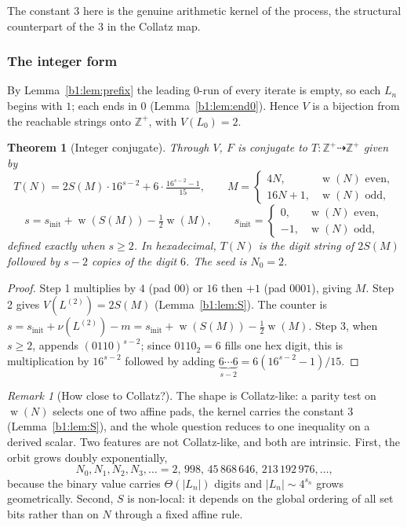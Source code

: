 \documentclass[a4paper]{article}
\theoremstyle{plain}
\newtheorem{thm}[theorem]{Theorem}
\theoremstyle{definition}
\theoremstyle{remark}
\newtheorem{remark}{Remark}[subsection]
\DeclareMathOperator{\popcount}{w}
\begin{document}
The constant $3$ here is the genuine arithmetic kernel of the process, the structural counterpart of the $3$ in the Collatz map.

\subsubsection{The integer form}\label{b1:sec:10.2}
By Lemma~\ref{b1:lem:prefix} the leading $0$-run of every iterate is empty, so each $L_n$ begins with $1$; each ends in $0$ (Lemma~\ref{b1:lem:end0}). Hence $V$ is a bijection from the reachable strings onto $\mathbb Z^+$, with $V(L_0)=2$.

\begin{thm}[Integer conjugate]\label{b1:thm:T}
Through $V$, $F$ is conjugate to $T:\mathbb Z^+\dashrightarrow\mathbb Z^+$ given by
\[ T(N)=2S(M)\cdot 16^{s-2}+6\cdot\tfrac{16^{s-2}-1}{15},\qquad M=\begin{cases}4N,& \popcount(N)\text{ even},\\ 16N+1,& \popcount(N)\text{ odd},\end{cases} \]
\[ s=s_{\mathrm{init}}+\popcount(S(M))-\tfrac12\popcount(M),\qquad s_{\mathrm{init}}=\begin{cases}0,& \popcount(N)\text{ even},\\ -1,& \popcount(N)\text{ odd},\end{cases} \]
defined exactly when $s\ge 2$. In hexadecimal, $T(N)$ is the digit string of $2S(M)$ followed by $s-2$ copies of the digit $6$. The seed is $N_0=2$.
\end{thm}
\begin{proof}
Step 1 multiplies by $4$ (pad $00$) or $16$ then $+1$ (pad $0001$), giving $M$. Step 2 gives $V(L^{(2)})=2S(M)$ (Lemma~\ref{b1:lem:S}). The counter is $s=s_{\mathrm{init}}+\nu(L^{(2)})-m=s_{\mathrm{init}}+\popcount(S(M))-\tfrac12\popcount(M)$. Step 3, when $s\ge 2$, appends $(0110)^{s-2}$; since $0110_2=6$ fills one hex digit, this is multiplication by $16^{s-2}$ followed by adding $\underbrace{6\cdots 6}_{s-2}=6(16^{s-2}-1)/15$.
\end{proof}

\begin{remark}[How close to Collatz?]\label{b1:rem:collatz}
The shape is Collatz-like: a parity test on $\popcount(N)$ selects one of two affine pads, the kernel carries the constant $3$ (Lemma~\ref{b1:lem:S}), and the whole question reduces to one inequality on a derived scalar. Two features are not Collatz-like, and both are intrinsic. First, the orbit grows doubly exponentially,
\[ N_0,N_1,N_2,N_3,\dots=2,\,998,\,45\,868\,646,\,213\,192\,976,\dots, \]
because the binary value carries $\Theta(|L_n|)$ digits and $|L_n|\sim 4^{s_n}$ grows geometrically. Second, $S$ is non-local: it depends on the global ordering of all set bits rather than on $N$ through a fixed affine rule.
\end{remark}
\end{document}
